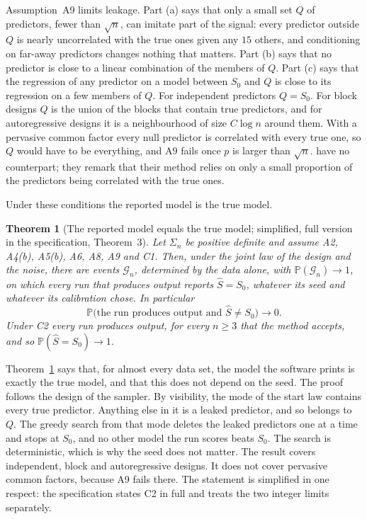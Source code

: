 \documentclass[11pt]{article}
\renewcommand{\P}{\mathbb{P}}
\newcommand{\Sz}{S_0}
\newcommand{\Sig}{\Sigma_n}
\newcommand{\Shat}{\hat S}
\theoremstyle{plain}
\newtheorem{thm}{Theorem}
\theoremstyle{definition}
\begin{document}
Assumption~A9 limits leakage. Part (a) says that only a small set $Q$ of predictors, fewer than $\sqrt n$, can imitate
part of the signal: every predictor outside $Q$ is nearly uncorrelated with the true ones given any $15$ others, and
conditioning on far-away predictors changes nothing that matters. Part (b) says that no predictor is close to a linear
combination of the members of $Q$. Part (c) says that the regression of any predictor on a model between $\Sz$ and $Q$
is close to its regression on a few members of $Q$. For independent predictors $Q=\Sz$. For block designs $Q$ is the
union of the blocks that contain true predictors, and for autoregressive designs it is a neighbourhood of size
$C\log n$ around them. With a pervasive common factor every null predictor is correlated with every true one, so $Q$
would have to be everything, and A9 fails once $p$ is larger than $\sqrt n$. \citet{SongLiang2015} have no counterpart;
they remark that their method relies on only a small proportion of the predictors being correlated with the true ones.

Under these conditions the reported model is the true model.

\begin{thm}[The reported model equals the true model; simplified, full version in the specification, Theorem~3]\label{thm:reported}
Let $\Sig$ be positive definite and assume A2, A4(b), A5(b), A6, A8, A9 and C1. Then, under the joint law of the design
and the noise, there are events $\mathcal G_n$, determined by the data alone, with $\P(\mathcal G_n)\to1$, on which
every run that produces output reports $\Shat=\Sz$, whatever its seed and whatever its calibration chose. In particular
\[
  \P\big(\text{the run produces output and }\Shat\neq\Sz\big)\to0 .
\]
Under C2 every run produces output, for every $n\ge3$ that the method accepts, and so $\P(\Shat=\Sz)\to1$.
\end{thm}

Theorem~\ref{thm:reported} says that, for almost every data set, the model the software prints is exactly the true
model, and that this does not depend on the seed. The proof follows the design of the sampler. By visibility, the mode
of the start law contains every true predictor. Anything else in it is a leaked predictor, and so belongs to $Q$. The
greedy search from that mode deletes the leaked predictors one at a time and stops at $\Sz$, and no other model the run
scores beats $\Sz$. The search is deterministic, which is why the seed does not matter. The result covers independent,
block and autoregressive designs. It does not cover pervasive common factors, because A9 fails there. The statement is
simplified in one respect: the specification states C2 in full and treats the two integer limits separately.
\end{document}
